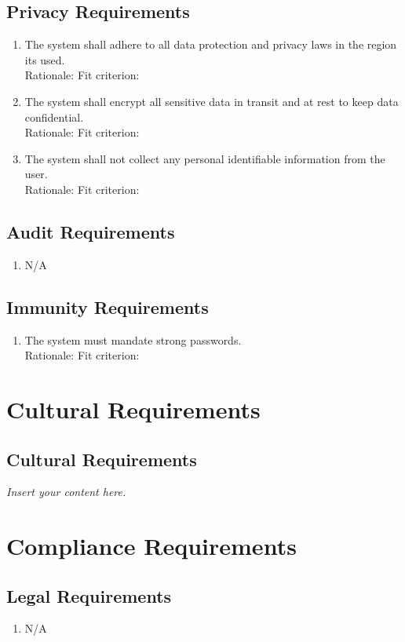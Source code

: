 \documentclass[12pt]{article}
\newcommand{\lips}{\textit{Insert your content here.}}
\begin{document}
\subsection{Privacy Requirements}
\begin{enumerate}[{SR-P}1. ]
  \item The system shall adhere to all data protection and privacy laws in the region its used.\\
  Rationale: 
  Fit criterion: 
  \item The system shall encrypt all sensitive data in transit and at rest to keep data confidential.\\
  Rationale: 
  Fit criterion: 
  \item The system shall not collect any personal identifiable information from the user.\\
  Rationale: 
  Fit criterion: 
\end{enumerate}
\subsection{Audit Requirements}
\begin{enumerate}[{SR-AU}1. ]
  \item N/A
\end{enumerate}
\subsection{Immunity Requirements}
\begin{enumerate}[{SR-IM}1. ]
  \item The system must mandate strong passwords.\\
  Rationale: 
  Fit criterion:
\end{enumerate}

\section{Cultural Requirements}
\subsection{Cultural Requirements}
\lips

\section{Compliance Requirements}
\subsection{Legal Requirements}
\begin{enumerate}[{CR-LR}1. ]
  \item N/A
\end{enumerate}
\end{document}

